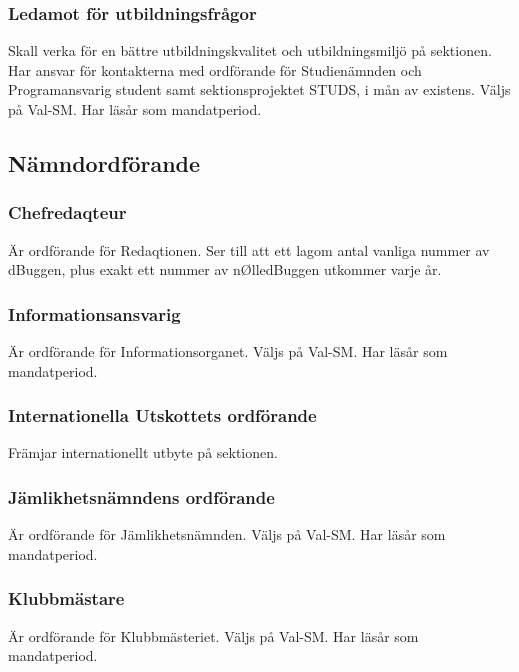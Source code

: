\documentclass{dgovdoc}
\begin{document}
\subsubsection{Ledamot för utbildningsfrågor}

Skall verka för en bättre utbildningskvalitet och utbildningsmiljö på sektionen. Har ansvar för kontakterna med ordförande för Studienämnden och Programansvarig student samt sektionsprojektet STUDS, i mån av existens. Väljs på Val-SM. Har läsår som mandatperiod.

\subsection{Nämndordförande}

\subsubsection{Chefredaqteur}

Är ordförande för Redaqtionen. Ser till att ett lagom antal vanliga nummer av dBuggen, plus exakt ett nummer av nØlledBuggen utkommer varje år.

\subsubsection{Informationsansvarig}

Är ordförande för Informationsorganet. Väljs på Val-SM. Har läsår som mandatperiod.

\subsubsection{Internationella Utskottets ordförande}

Främjar internationellt utbyte på sektionen.

\subsubsection{Jämlikhetsnämndens ordförande}

Är ordförande för Jämlikhetsnämnden. Väljs på Val-SM. Har läsår som mandatperiod.

\subsubsection{Klubbmästare}

Är ordförande för Klubbmästeriet. Väljs på Val-SM. Har läsår som mandatperiod.
\end{document}
